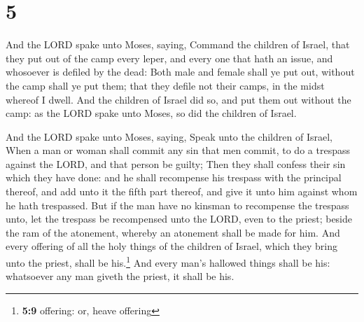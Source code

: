 \hypertarget{section-4}{%
\section{5}\label{section-4}}

 And the LORD spake unto Moses, saying, 
Command the children of Israel, that they put out of the camp every
leper, and every one that hath an issue, and whosoever is defiled by the
dead:  Both male and female shall ye put out, without the
camp shall ye put them; that they defile not their camps, in the midst
whereof I dwell.  And the children of Israel did so, and
put them out without the camp: as the LORD spake unto Moses, so did the
children of Israel.

 And the LORD spake unto Moses, saying, 
Speak unto the children of Israel, When a man or woman shall commit any
sin that men commit, to do a trespass against the LORD, and that person
be guilty;  Then they shall confess their sin which they
have done: and he shall recompense his trespass with the principal
thereof, and add unto it the fifth part thereof, and give it unto him
against whom he hath trespassed.  But if the man have no
kinsman to recompense the trespass unto, let the trespass be recompensed
unto the LORD, even to the priest; beside the ram of the atonement,
whereby an atonement shall be made for him.  And every
offering of all the holy things of the children of Israel, which they
bring unto the priest, shall be his.\footnote{\textbf{5:9} offering: or,
  heave offering}  And every man's hallowed things shall
be his: whatsoever any man giveth the priest, it shall be his.

